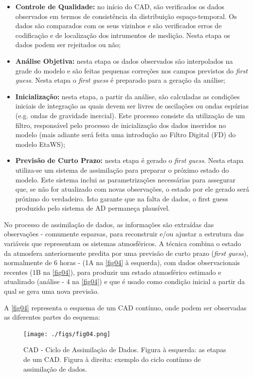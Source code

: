 \begin{itemize}
\item \textbf{Controle de Qualidade:} no início do CAD, são verificados os dados observados em termos de consistência da distribuição espaço-temporal. Os dados são comparados com os seus vizinhos e são verificados erros de codificação e de localização dos intrumentos de medição. Nesta etapa os dados podem ser rejeitados ou não;
\item \textbf{Análise Objetiva:} nesta etapa os dados observados são interpolados na grade do modelo e são feitas pequenas correções nos campos previstos do \textit{first guess}. Nesta etapa o \textit{first guess} é preparado para a geração da análise;
\item \textbf{Inicialização:} nesta etapa, a partir da análise, são calculadas as condições iniciais de integração as quais devem ser livres de oscilações ou ondas espúrias (e.g. ondas de gravidade inercial). Este processo consiste da utilização de um filtro, responsável pelo processo de inicialização  dos dados inseridos no modelo (mais adiante será feita uma introdução ao Filtro Digital (FD) do modelo EtaWS);
\item \textbf{Previsão de Curto Prazo:} nesta etapa é gerado o \textit{first guess}. Nesta etapa utiliza-se um sistema de assimilação para preparar o próximo estado do modelo. Este sistema inclui as parametrizações necessárias para assegurar que, se não for atualizado com novas observações, o estado por ele gerado será próximo do verdadeiro. Isto garante que na falta de dados, o first guess produzido pelo sistema de AD permaneça plausível.
\end{itemize}

No processo de assimilação de dados, as informações são extraídas das observações - comumente esparsas, para reconstruir e/ou ajustar a estrutura das variáveis que representam os sistemas atmosféricos. A técnica combina o estado da atmosfera anteriormente predita por uma previsão de curto prazo (\textit{first guess}), normalmente de 6 horas - (1A na \autoref{fig04} à esquerda), com dados observacionais recentes (1B na \autoref{fig04}), para produzir um estado atmosférico estimado e atualizado (análise - 4 na \autoref{fig04}) e que é usado como condição inicial a partir da qual se gera uma nova previsão.

A \autoref{fig04} representa o esquema de um CAD contínuo, onde podem ser observadas as diferentes partes do esquema:

\begin{figure}
\centering
\texttt{[image: ./figs/fig04.png]}
\caption{CAD - Ciclo de Assimilação de Dados. Figura à esquerda: as etapas de um CAD. Figura à direita: exemplo do ciclo contínuo de assimilação de dados.}
\label{fig04}
\end{figure}

